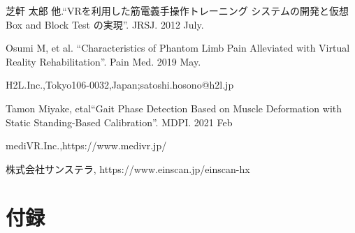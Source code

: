 \documentclass{ltjsreport}
\begin{document}
\begin{thebibliography}{99}

	芝軒 太郎 他.``VRを利用した筋電義手操作トレーニング
	システムの開発と仮想 Box and Block Test の実現''.
	JRSJ. 2012 July.

	Osumi M, et al.
	``Characteristics of Phantom Limb Pain Alleviated
	with Virtual Reality Rehabilitation''.
	Pain Med. 2019 May.

	H2L.Inc.,Tokyo106-0032,Japan;satoshi.hosono@h2l.jp

	Tamon Miyake, etal``Gait Phase Detection Based on Muscle Deformation
	with Static Standing-Based Calibration''.
	MDPI. 2021 Feb

	mediVR.Inc.,https://www.medivr.jp/

	株式会社サンステラ, https://www.einscan.jp/einscan-hx



\end{thebibliography}
\chapter*{付録}
\end{document}
